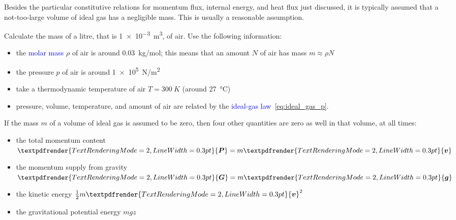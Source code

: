 \documentclass[a4paper,12pt,%
onecolumn,oneside,titlepage,%
british%
]{memoir}
\renewcommand*{\bm}[1]{\textpdfrender{TextRenderingMode=2,LineWidth=0.3pt}{\boldsymbol{#1}}}
\renewcommand*{\|}[1][]{\nonscript\:#1\vert\nonscript\:\mathopen{}}
\newcommand*{\sect}{\S}%
\renewcommand*{\autoref}[2]{\sidepar{\vspace{-1ex}\footnotesize{\color{blue}\faIcon{%
reply%
}\enspace\sect\,\ref{#1} page\,\pageref{#1}}}\textcolor{blue}{#2}}
\newcommand*{\yv}{\bm{v}}
\newcommand*{\ypr}{p}
\newcommand*{\yN}{N}
\newcommand*{\yrho}{\rho}
\newcommand*{\yM}{m}%
\newcommand*{\yg}{\bm{g}}%
\newcommand*{\yP}{\bm{P}}
\newcommand*{\yG}{\bm{G}}
\newcommand*{\yte}{T}%
\begin{document}
Besides the particular constitutive relations for momentum flux, internal energy, and heat flux just discussed, it is typically assumed that a not-too-large volume of ideal gas has a negligible mass. This is usually a reasonable assumption.
\begin{exercise}
  Calculate the mass of a litre, that is \qty[print-unity-mantissa=false]{1e-3}{m^3}, of air. Use the following information:
  \begin{itemize}[nosep]
  \item the \autoref{def:molarmass}{molar mass} $\yrho$ of air is around \qty{0.03}{kg/mol}; this means that an amount $\yN$ of air has mass $\yM\approx\yrho\yN$
  \item the pressure $\ypr$ of air is around \qty[print-unity-mantissa=false]{1e5}{N/m^2}
  \item take a thermodynamic temperature of air $\yte=\qty{300}{K}$ (around \qty{27}{\degreeCelsius})
  \item pressure, volume, temperature, and amount of air are related by the \autoref{def:idealgas_law}{ideal-gas law}~\eqref{eq:ideal_gas_p}.
  \end{itemize}
\end{exercise}%

If the mass $\yM$ of a volume of ideal gas is assumed to be zero, then four other quantities are zero as well in that volume, at all times:
\begin{itemize}[nosep]
\item the total momentum content $\yP=\yM\yv$
\item the momentum supply from gravity $\yG=\yM\yg$
\item the kinetic energy $\tfrac12\yM\yv^{2}$
\item the gravitational potential energy $\yM g z$
\end{itemize}
\end{document}
